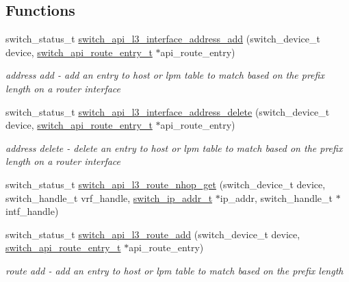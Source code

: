 \subsection*{Functions}
\begin{DoxyCompactItemize}
\item 
switch\+\_\+status\+\_\+t \hyperlink{group__L3_ga52ec8a9873b62d593070e13e90f8f676}{switch\+\_\+api\+\_\+l3\+\_\+interface\+\_\+address\+\_\+add} (switch\+\_\+device\+\_\+t device, \hyperlink{group__L3_ga969f26e2a3436107bc9b6e9f749c79b8}{switch\+\_\+api\+\_\+route\+\_\+entry\+\_\+t} $\ast$api\+\_\+route\+\_\+entry)
\begin{DoxyCompactList}\small\item\em address add -\/ add an entry to host or lpm table to match based on the prefix length on a router interface \end{DoxyCompactList}\item 
switch\+\_\+status\+\_\+t \hyperlink{group__L3_gac217b56ef6aea0e2e4a111461803cfbe}{switch\+\_\+api\+\_\+l3\+\_\+interface\+\_\+address\+\_\+delete} (switch\+\_\+device\+\_\+t device, \hyperlink{group__L3_ga969f26e2a3436107bc9b6e9f749c79b8}{switch\+\_\+api\+\_\+route\+\_\+entry\+\_\+t} $\ast$api\+\_\+route\+\_\+entry)
\begin{DoxyCompactList}\small\item\em address delete -\/ delete an entry to host or lpm table to match based on the prefix length on a router interface \end{DoxyCompactList}\item 
switch\+\_\+status\+\_\+t \hyperlink{group__L3_ga3e886527cbb4d94e02d21422bc42eed0}{switch\+\_\+api\+\_\+l3\+\_\+route\+\_\+nhop\+\_\+get} (switch\+\_\+device\+\_\+t device, switch\+\_\+handle\+\_\+t vrf\+\_\+handle, \hyperlink{structswitch__ip__addr__s}{switch\+\_\+ip\+\_\+addr\+\_\+t} $\ast$ip\+\_\+addr, switch\+\_\+handle\+\_\+t $\ast$intf\+\_\+handle)
\item 
switch\+\_\+status\+\_\+t \hyperlink{group__L3_ga87de10e3d458dad5ed0c629ad16fbec3}{switch\+\_\+api\+\_\+l3\+\_\+route\+\_\+add} (switch\+\_\+device\+\_\+t device, \hyperlink{group__L3_ga969f26e2a3436107bc9b6e9f749c79b8}{switch\+\_\+api\+\_\+route\+\_\+entry\+\_\+t} $\ast$api\+\_\+route\+\_\+entry)
\begin{DoxyCompactList}\small\item\em route add -\/ add an entry to host or lpm table to match based on the prefix length \end{DoxyCompactList}\item 

\end{DoxyCompactItemize}
